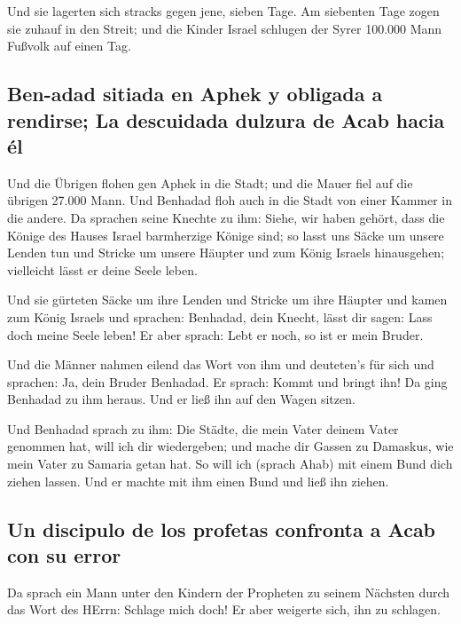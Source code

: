  Und sie lagerten sich stracks gegen jene, sieben Tage.
Am siebenten Tage zogen sie zuhauf in den Streit; und die Kinder Israel
schlugen der Syrer 100.000 Mann Fußvolk auf einen Tag.

\hypertarget{ben-adad-sitiada-en-aphek-y-obligada-a-rendirse-la-descuidada-dulzura-de-acab-hacia-uxe9l}{%
\subsection{Ben-adad sitiada en Aphek y obligada a rendirse; La
descuidada dulzura de Acab hacia
él}\label{ben-adad-sitiada-en-aphek-y-obligada-a-rendirse-la-descuidada-dulzura-de-acab-hacia-uxe9l}}

 Und die Übrigen flohen gen Aphek in die Stadt; und die
Mauer fiel auf die übrigen 27.000 Mann. Und Benhadad floh auch in die
Stadt von einer Kammer in die andere.  Da sprachen seine
Knechte zu ihm: Siehe, wir haben gehört, dass die Könige des Hauses
Israel barmherzige Könige sind; so lasst uns Säcke um unsere Lenden tun
und Stricke um unsere Häupter und zum König Israels hinausgehen;
vielleicht lässt er deine Seele leben.

 Und sie gürteten Säcke um ihre Lenden und Stricke um
ihre Häupter und kamen zum König Israels und sprachen: Benhadad, dein
Knecht, lässt dir sagen: Lass doch meine Seele leben! Er aber sprach:
Lebt er noch, so ist er mein Bruder.

 Und die Männer nahmen eilend das Wort von ihm und
deuteten's für sich und sprachen: Ja, dein Bruder Benhadad. Er sprach:
Kommt und bringt ihn! Da ging Benhadad zu ihm heraus. Und er ließ ihn
auf den Wagen sitzen.

 Und Benhadad sprach zu ihm: Die Städte, die mein Vater
deinem Vater genommen hat, will ich dir wiedergeben; und mache dir
Gassen zu Damaskus, wie mein Vater zu Samaria getan hat. So will ich
(sprach Ahab) mit einem Bund dich ziehen lassen. Und er machte mit ihm
einen Bund und ließ ihn ziehen.

\hypertarget{un-discipulo-de-los-profetas-confronta-a-acab-con-su-error}{%
\subsection{Un discipulo de los profetas confronta a Acab con su
error}\label{un-discipulo-de-los-profetas-confronta-a-acab-con-su-error}}

 Da sprach ein Mann unter den Kindern der Propheten zu
seinem Nächsten durch das Wort des HErrn: Schlage mich doch! Er aber
weigerte sich, ihn zu schlagen.

